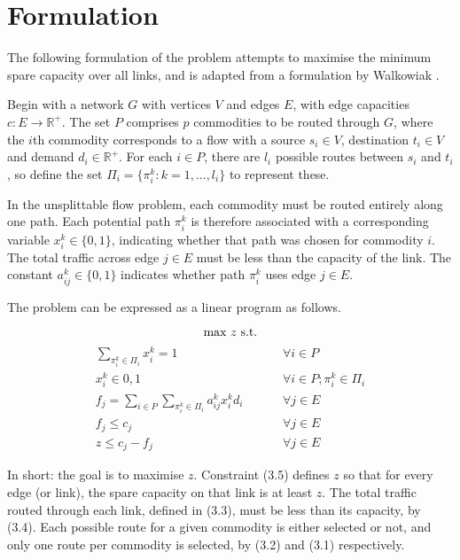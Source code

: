 \documentclass[12pt,a4paper]{article}
\begin{document}
\section{Formulation}
The following formulation of the problem attempts to maximise the minimum spare capacity over all links, and is adapted from a formulation by Walkowiak \cite{walkowiak:residual}.

Begin with a network $G$ with vertices $V$ and edges $E$, with edge capacities $c : E \rightarrow \mathbb{R}^+$. The set $P$ comprises $p$ commodities to be routed through $G$, where the $i$th commodity corresponds to a flow with a source $s_i \in V$, destination $t_i \in V$ and demand $d_i \in \mathbb{R}^+$. For each $i \in P$, there are $l_i$ possible routes between $s_i$ and $t_i$, so define the set $\Pi_i = \{\pi_i^k : k = 1, ..., l_i\}$ to represent these.

In the unsplittable flow problem, each commodity must be routed entirely along one path. Each potential path $\pi_i^k$ is therefore associated with a corresponding variable $x_i^k \in \{0,1\}$, indicating whether that path was chosen for commodity $i$. The total traffic across edge $j \in E$ must be less than the capacity of the link. The constant $a_{ij}^k \in \{0,1\}$ indicates whether path $\pi_i^k$ uses edge $j \in E$.

The problem can be expressed as a linear program as follows.

\begin{equation*}
	\text{max } z \text{ s.t.} \\
\end{equation*}
\begin{align}
	\sum_{\pi_i^k \in \Pi_i} x_i^k = 1 \hspace{1cm} &\forall i \in P \\
	x_i^k \in {0,1} \hspace{1cm} &\forall i \in P; \pi_i^k \in \Pi_i \\
	f_j = \sum_{i \in P} \sum_{\pi_i^k \in \Pi_i} a_{ij}^k x_i^k d_i \hspace{1cm} &\forall j \in E \\
	f_j \leq c_j \hspace{1cm} &\forall j \in E \\
	z \leq c_j - f_j \hspace{1cm} &\forall j \in E
\end{align}

In short: the goal is to maximise $z$. Constraint (3.5) defines $z$ so that for every edge (or link), the spare capacity on that link is at least $z$. The total traffic routed through each link, defined in (3.3), must be less than its capacity, by (3.4). Each possible route for a given commodity is either selected or not, and only one route per commodity is selected, by (3.2) and (3.1) respectively.

\end{document}
